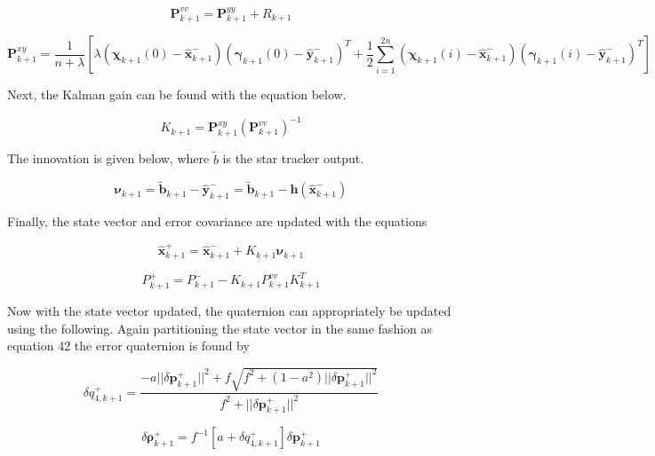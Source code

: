 \documentclass[12pt]{report}
\begin{document}
\begin{equation}
	{\pmb{P}}_{k+1}^{vv} = {\pmb{P}}_{k+1}^{yy} + R_{k+1}
\end{equation}

\begin{equation}
	{\pmb{P}}_{k+1}^{xy} = \frac{1}{n + \lambda} [\lambda (\pmb{\chi}_{k+1}(0) - \hat{\pmb{x}}_{k+1}^-)
	(\pmb{\gamma}_{k+1}(0) - \hat{\pmb{y}}_{k+1}^-)^T + \frac{1}{2}\sum_{i =1}^{2n}(\pmb{\chi}_{k+1}(i) - \hat{\pmb{x}}_{k+1}^-)
	(\pmb{\gamma}_{k+1}(i) - \hat{\pmb{y}}_{k+1}^-)^T] 
\end{equation}

\noindent Next, the Kalman gain can be found with the equation below.

\begin{equation}
	K_{k+1} = 	{\pmb{P}}_{k+1}^{xy} ({\pmb{P}}_{k+1}^{vv})^{-1}
\end{equation}

\noindent The innovation is given below, where $\tilde{b}$ is the star tracker output.

\begin{equation}
	\pmb{\nu}_{k+1} = \tilde{\pmb{b}}_{k+1} - \hat{\pmb{y}}_{k+1}^- = \tilde{\pmb{b}}_{k+1} - \pmb{h}(\hat{\pmb{x}}_{k+1}^-)
\end{equation}

\noindent Finally, the state vector and error covariance are updated with the equations 

\begin{equation}
	\hat{\pmb{x}}_{k+1}^+ = \hat{\pmb{x}}_{k+1}^- + K_{k+1} \pmb{\nu}_{k+1}
\end{equation}

\begin{equation}
	P_{k+1}^+ = P_{k+1}^-  - K_{k+1}P_{k+1}^{vv} K_{k+1}^T
\end{equation}

\noindent Now with the state vector updated, the quaternion can appropriately be updated using the following. Again partitioning the state vector in the same fashion as equation 42 the error quaternion is found by

 \begin{equation}
	\delta q_{4,k+1}^+ = \frac{-a||\delta\pmb{p}_{k+1}^+||^2 + f \sqrt{f^2 + (1 - a^2)||\delta\pmb{p}_{k+1}^+||^2}}{f^2 + ||\delta\pmb{p}_{k+1}^+||^2} 
\end{equation} 

\begin{equation}
	\delta \pmb{\rho}_{k+1}^+ = f^{-1} [a + \delta q_{4,k+1}^+]\delta\pmb{p}_{k+1}^+
\end{equation} 
\end{document}
